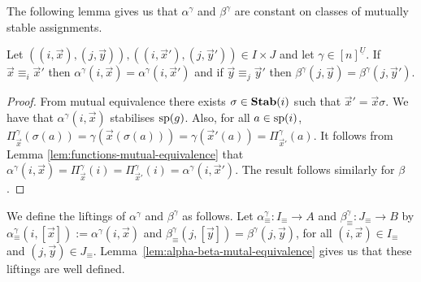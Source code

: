 \documentclass[../paper.tex]{subfiles}
\begin{document}

The following lemma gives us that $\alpha^{\gamma}$ and $\beta^{\gamma}$ are
constant on classes of mutually stable assignments.

\begin{lem}
	Let $((i, \vec{x}), (j, \vec{y})), ((i, \vec{x}'), (j, \vec{y}')) \in I \times
  J$ and let $\gamma \in [n]^{\underline{U}}$. If $\vec{x} \equiv_i \vec{x}'$
  then $\alpha^{\gamma}(i, \vec{x}) = \alpha^{\gamma}(i, \vec{x}')$ and if
  $\vec{y} \equiv_j \vec{y}'$ then $\beta^{\gamma}(j, \vec{y}) =
  \beta^{\gamma}(j, \vec{y}')$.
	\label{lem:alpha-beta-mutal-equivalence}
\end{lem}
\begin{proof}
	From mutual equivalence there exists $\sigma \in \text{\textbf{Stab}}(i)$ such that $\vec{x}'
  = \vec{x} \sigma$. We have that $\alpha^{\gamma}(i, \vec{x})$ stabilises
  $\text{sp}(g)$. Also, for all $a \in \text{sp}(i)$, $\Pi^{\gamma}_{\vec{x}} (\sigma
  (a)) = \gamma (\vec{x}(\sigma (a))) = \gamma (\vec{x}'(a)) =
  \Pi^{\gamma}_{\vec{x}'}(a)$. It follows from Lemma
  \ref{lem:functions-mutual-equivalence} that $\alpha^{\gamma}(i,\vec{x}) =
  \Pi^{\gamma}_{\vec{x}} (i) = \Pi^{\gamma}_{\vec{x}'}(i) = \alpha^{\gamma}(i,
  \vec{x}')$. The result follows similarly for $\beta$.
\end{proof}

We define the liftings of $\alpha^{\gamma}$ and $\beta^{\gamma}$ as follows. Let
$\alpha^{\gamma}_{\equiv} : I_\equiv \rightarrow A$ and $\beta^{\gamma}_\equiv:
J_\equiv \rightarrow B$ by $\alpha^{\gamma}_{\equiv}(i, [\vec{x}]) :=
\alpha^{\gamma} (i, \vec{x})$ and $\beta^{\gamma}_{\equiv}(j, [\vec{y}]) =
\beta^{\gamma} (j, \vec{y})$, for all $(i, \vec{x}) \in I_{\equiv}$ and $(j,
\vec{y}) \in J_\equiv$. Lemma~\ref{lem:alpha-beta-mutal-equivalence} gives us
that these liftings are well defined.

\end{document}

